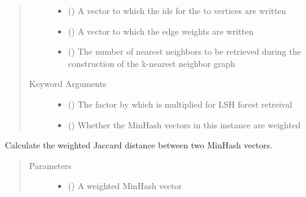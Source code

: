 \documentclass[letterpaper,10pt,english]{sphinxmanual}
\begin{document}
\begin{fulllineitems}
\begin{fulllineitems}
\begin{quote}
\begin{description}
\begin{itemize}
\item {} 
 () \textendash{} A vector to which the ids for the to vertices are written

\item {} 
 () \textendash{} A vector to which the edge weights are written

\item {} 
 () \textendash{} The number of nearest neighbors to be retrieved during the construction of the k-nearest neighbor graph

\end{itemize}

\item[{Keyword Arguments}] \leavevmode\begin{itemize}
\item {} 
 () \textendash{} The factor by which  is multiplied for LSH forest retreival

\item {} 
 () \textendash{} Whether the MinHash vectors in this {\hyperref[\detokenize{documentation:tmap.LSHForest}]{}} instance are weighted

\end{itemize}

\end{description}\end{quote}

\end{fulllineitems}


\begin{fulllineitems}
\label{\detokenize{documentation:tmap.LSHForest.get_weighted_distance}}
Calculate the weighted Jaccard distance between two MinHash vectors.
\begin{quote}\begin{description}
\item[{Parameters}] \leavevmode\begin{itemize}
\item {} 
 () \textendash{} A weighted MinHash vector


\end{itemize}
\end{description}
\end{quote}
\end{fulllineitems}
\end{fulllineitems}
\end{document}
